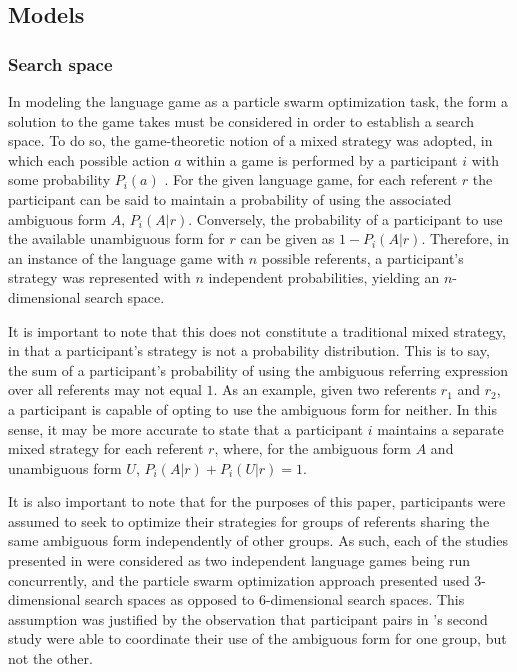 \documentclass[12pt,a4paper]{article}
\begin{document}
\subsection{Models}


\subsubsection{Search space}
\label{sec:search_space}

In modeling the \citeauthor{rohde2012} language game as a particle swarm optimization task, the form a solution to the game takes must be considered in order to establish a search space.  To do so, the game-theoretic notion of a mixed strategy was adopted, in which each possible action $a$ within a game is performed by a participant $i$ with some probability $P_i(a)$ \citep[p.~22]{benz2005}. For the given language game, for each referent $r$ the participant can be said to maintain a probability of using the associated ambiguous form $A$, $P_i(A|r)$. Conversely, the probability of a participant to use the available unambiguous form for $r$ can be given as $1 - P_i(A|r)$. Therefore, in an instance of the \citeauthor{rohde2012} language game with $n$ possible referents, a participant's strategy was represented with $n$ independent probabilities, yielding an $n$-dimensional search space. 

It is important to note that this does not constitute a traditional mixed strategy, in that a participant's strategy is not a probability distribution. This is to say, the sum of a participant's probability of using the ambiguous referring expression over all referents may not equal $1$. As an example, given two referents $r_1$ and $r_2$, a participant is capable of opting to use the ambiguous form for neither. In this sense, it may be more accurate to state that a participant $i$ maintains a separate mixed strategy for each referent $r$, where, for the ambiguous form $A$ and unambiguous form $U$, $P_i(A|r) + P_i(U|r) = 1$.

It is also important to note that for the purposes of this paper, participants were assumed to seek to optimize their strategies for groups of referents sharing the same ambiguous form independently of other groups. As such, each of the studies presented in \citeauthor{rohde2012} were considered as two independent language games being run concurrently, and the particle swarm optimization approach presented used 3-dimensional search spaces as opposed to 6-dimensional search spaces. This assumption was justified by the observation that participant pairs in \citeauthor{rohde2012}'s second study were able to coordinate their use of the ambiguous form for one group, but not the other. 
\end{document}
